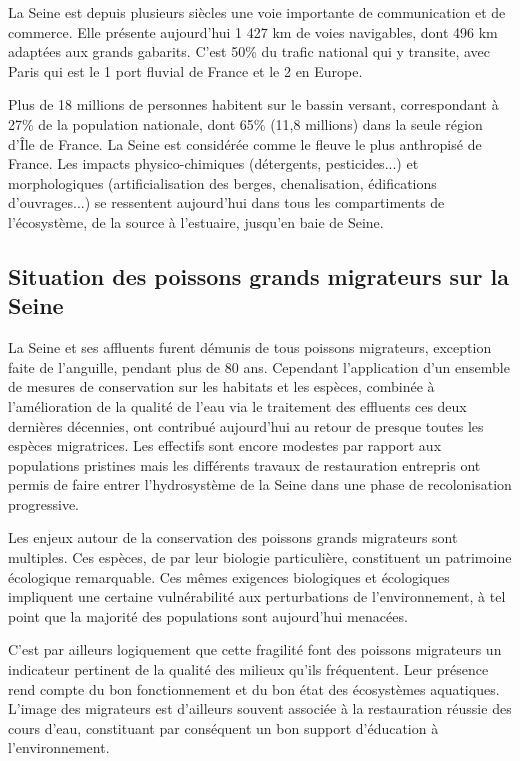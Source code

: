 \documentclass[11pt,titlepage,twoside]{article}\usepackage[]{graphicx}\usepackage[table]{xcolor}
\begin{document}
La Seine est depuis plusieurs siècles une voie importante de communication et de commerce. Elle présente aujourd'hui 1 427 km de voies navigables, dont 496 km adaptées aux grands gabarits. C'est 50\% du trafic national qui y transite, avec Paris qui est le 1 port fluvial de France et le 2 en Europe.

Plus de 18 millions de personnes habitent sur le bassin versant, correspondant à 27\% de la population nationale, dont 65\% (11,8 millions) dans la seule région d’Île de France. La Seine est considérée comme le fleuve le plus anthropisé de France. Les impacts physico-chimiques (détergents, pesticides...) et morphologiques (artificialisation des berges, chenalisation, édifications d'ouvrages...) se ressentent aujourd'hui dans tous les compartiments de l'écosystème, de la source à l'estuaire, jusqu'en baie de Seine.

\subsection{Situation des poissons grands migrateurs sur la Seine}

La Seine et ses affluents furent démunis de tous poissons migrateurs, exception faite de l'anguille, pendant plus de 80 ans. Cependant l'application d'un ensemble de mesures de conservation sur les habitats et les espèces, combinée à l'amélioration de la qualité de l'eau via le traitement des effluents ces deux dernières décennies, ont contribué aujourd'hui au retour de presque toutes les espèces migratrices. Les effectifs sont encore modestes par rapport aux populations pristines mais les différents travaux de restauration entrepris ont permis de faire entrer l'hydrosystème de la Seine dans une phase de recolonisation progressive. 

Les enjeux autour de la conservation des poissons grands migrateurs sont multiples. Ces espèces, de par leur biologie particulière, constituent un patrimoine écologique remarquable. Ces mêmes exigences biologiques et écologiques impliquent une certaine vulnérabilité aux perturbations de l'environnement, à tel point que la majorité des populations sont aujourd'hui menacées.

C'est par ailleurs logiquement que cette fragilité font des poissons migrateurs un indicateur pertinent de la qualité des milieux qu'ils fréquentent. Leur présence rend compte du bon fonctionnement et du bon état des écosystèmes aquatiques. L'image des migrateurs est d'ailleurs souvent associée à la restauration \og réussie \fg{} des cours d'eau, constituant par conséquent un bon support d'éducation à l'environnement.
\end{document}
